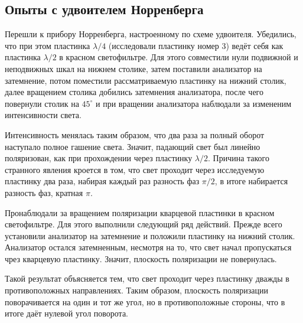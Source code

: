 \documentclass[12pt]{article}
\begin{document}
	\subsection{Опыты с удвоителем Норренберга}
	Перешли к прибору Норренберга, настроенному по схеме удвоителя. Убедились, что при этом пластинка $\lambda/4$ (исследовали пластинку номер 3) ведёт себя как пластинка $\lambda/2$ в красном светофильтре. Для этого совместили нули подвижной и неподвижных шкал на нижнем столике, затем поставили анализатор на затемнение, потом поместили рассматриваемую пластинку на нижний столик, далее вращением столика добились затемнения анализатора, после чего повернули столик на $45^\circ$ и при вращении анализатора наблюдали за измененим интенсивности света.
	\par Интенсивность менялась таким образом, что два раза за полный оборот наступало полное гашение света. Значит, падающий свет был линейно поляризован, как при прохождении через пластинку $\lambda/2$. Причина такого странного явления кроется в том, что свет проходит через исследуемую пластинку два раза, набирая каждый раз разность фаз $\pi/2$, в итоге набирается разность фаз, кратная $\pi$. 
	\\
	\par Пронаблюдали за вращением поляризации кварцевой пластинки в красном светофильтре. Для этого выполнили следующий ряд действий. Прежде всего установили анализатор на затемнение и положили пластинку на нижний столик. Анализатор остался затемненным, несмотря на то, что свет начал пропускаться чрез кварцевую пластинку. Значит, плоскость поляризации не повернулась.
	\par Такой результат объясняется тем, что свет проходит через пластинку дважды в противоположных направлениях. Таким образом, плоскость поляризации поворачивается на один и тот же угол, но в противоположные стороны, что в итоге даёт нулевой угол поворота.
\end{document}
